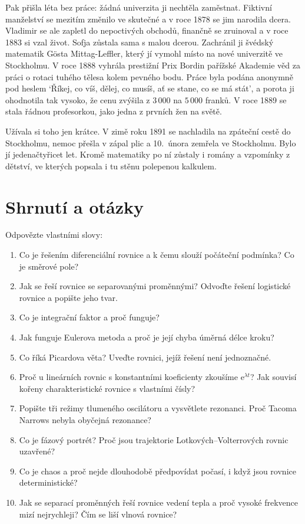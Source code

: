 Pak přišla léta bez práce: žádná univerzita ji nechtěla zaměstnat. Fiktivní manželství se mezitím změnilo ve skutečné a v roce 1878 se jim narodila dcera. Vladimir se ale zapletl do nepoctivých obchodů, finančně se zruinoval a v roce 1883 si vzal život. Sofja zůstala sama s malou dcerou. Zachránil ji švédský matematik Gösta Mittag-Leffler, který jí vymohl místo na nové univerzitě ve Stockholmu. V roce 1888 vyhrála prestižní Prix Bordin pařížské Akademie věd za práci o rotaci tuhého tělesa kolem pevného bodu. Práce byla podána anonymně pod heslem `Říkej, co víš, dělej, co musíš, ať se stane, co se má stát', a porota ji ohodnotila tak vysoko, že cenu zvýšila z $3\,000$ na $5\,000$ franků. V roce 1889 se stala řádnou profesorkou, jako jedna z prvních žen na světě.

Užívala si toho jen krátce. V zimě roku 1891 se nachladila na zpáteční cestě do Stockholmu, nemoc přešla v zápal plic a 10.~února zemřela ve Stockholmu. Bylo jí jedenačtyřicet let. Kromě matematiky po ní zůstaly i romány a vzpomínky z dětství, ve kterých popsala i tu stěnu polepenou kalkulem.

\section{Shrnutí a otázky}

\begin{problem}
  Odpovězte vlastními slovy:
  \begin{enumerate}
    \item Co je řešením diferenciální rovnice a k čemu slouží počáteční podmínka? Co je směrové pole?
    \item Jak se řeší rovnice se separovanými proměnnými? Odvoďte řešení logistické rovnice a popište jeho tvar.
    \item Co je integrační faktor a proč funguje?
    \item Jak funguje Eulerova metoda a proč je její chyba úměrná délce kroku?
    \item Co říká Picardova věta? Uveďte rovnici, jejíž řešení není jednoznačné.
    \item Proč u lineárních rovnic s konstantními koeficienty zkoušíme $\mathrm{e}^{\lambda t}$? Jak souvisí kořeny charakteristické rovnice s vlastními čísly?
    \item Popište tři režimy tlumeného oscilátoru a vysvětlete rezonanci. Proč Tacoma Narrows nebyla obyčejná rezonance?
    \item Co je fázový portrét? Proč jsou trajektorie Lotkových--Volterrových rovnic uzavřené?
    \item Co je chaos a proč nejde dlouhodobě předpovídat počasí, i když jsou rovnice deterministické?
    \item Jak se separací proměnných řeší rovnice vedení tepla a proč vysoké frekvence mizí nejrychleji? Čím se liší vlnová rovnice?
  \end{enumerate}
\end{problem}
